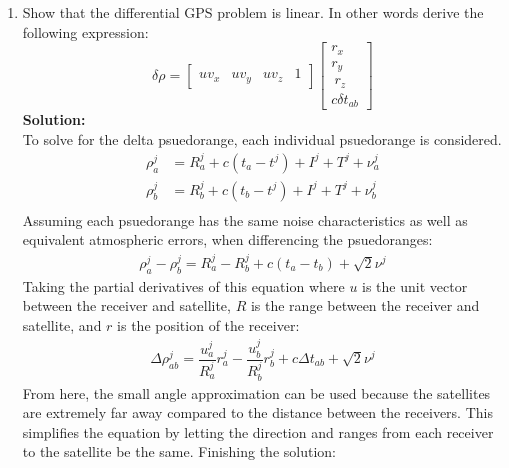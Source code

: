 \documentclass[11pt]{article}
\newcommand{\solution}{\textbf{Solution: \\}}
\begin{document}
\begin{enumerate}[label=\textbf{\arabic*.}]
  \vspace{24pt}
  \item Show that the differential GPS problem is linear. In other words 
  derive the following expression:
  \begin{equation*}
    \delta \rho = 
    \begin{bmatrix}
      uv_x & uv_y & uv_z & 1
    \end{bmatrix}
    \begin{bmatrix}
      r_x \\ r_y \\\ r_z \\ c \delta t_{ab}
    \end{bmatrix}
  \end{equation*}
  \solution
  To solve for the delta psuedorange, each individual psuedorange is considered.
  \begin{equation*}
    \begin{split}
      \rho_a^j &= R_a^j + c(t_a-t^j) + I^j + T^j + \nu_a^j \\
      \rho_b^j &= R_b^j + c(t_b-t^j) + I^j + T^j + \nu_b^j \\
    \end{split}
  \end{equation*}
  Assuming each psuedorange has the same noise characteristics as well as 
  equivalent atmospheric errors, when differencing the psuedoranges:
  \begin{equation*}
    \begin{split}
      \rho_a^j - \rho_b^j = R_a^j - R_b^j + c(t_a-t_b) + \sqrt{2}\nu^j
    \end{split}
  \end{equation*}
  Taking the partial derivatives of this equation where $u$ is the unit vector 
  between the receiver and satellite, $R$ is the range between the receiver and 
  satellite, and $r$ is the position of the receiver:
  \begin{equation*}
    \begin{split}
      \Delta\rho_{ab}^j = \dfrac{u_a^j}{R_a^j}r_a^j - \dfrac{u_b^j}{R_b^j}r_b^j  + c\Delta t_{ab} + \sqrt{2}\nu^j
    \end{split}
  \end{equation*}
  From here, the small angle approximation can be used because the satellites 
  are extremely far away compared to the distance between the receivers. This 
  simplifies the equation by letting the direction and ranges from each receiver 
  to the satellite be the same. Finishing the solution:

\end{enumerate}
\end{document}
